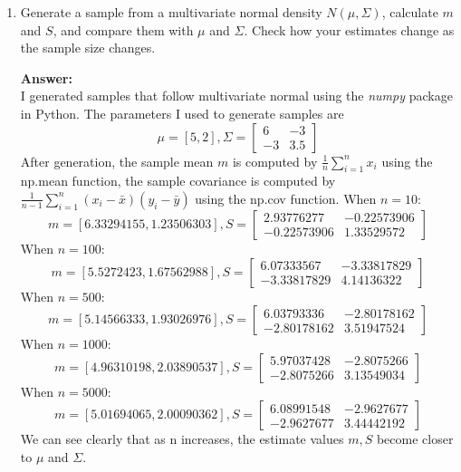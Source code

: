 \documentclass{article}
\begin{document}
\begin{enumerate}
    \item Generate a sample from a multivariate normal density $N(\mu, \Sigma)$, calculate $m$ and $S$, and compare them with $\mu$ and $\Sigma$. Check how your estimates change as the sample size changes. %
    
    \textbf{Answer:} \\
    I generated samples that follow multivariate normal using the \emph{numpy} package in Python. 
    The parameters I used to generate samples are 
    $$
    \mu=[5, 2], \Sigma=
    \left[\begin{array}{ll}
    6 & -3 \\
    -3 & 3.5
    \end{array}\right]
    $$
    After generation, the sample mean $m$ is computed by $\frac{1}{n}\sum^n_{i=1} x_i$ using the np.mean function, the sample covariance is computed by $\frac{1}{n-1}\sum_{i=1}^n (x_i-\bar x)(y_i-\bar y)$ using the np.cov function. 
    When $n=10$:\\
    $$
    m = [6.33294155, 1.23506303], S = 
    \left[\begin{array}{ll}
        2.93776277 & -0.22573906 \\
        -0.22573906 & 1.33529572
        \end{array}\right]
    $$
    When $n=100$:\\
    $$
    m = [5.5272423, 1.67562988], S = 
    \left[\begin{array}{ll}
        6.07333567 & -3.33817829 \\
        -3.33817829 & 4.14136322
        \end{array}\right]
    $$
    When $n=500$:\\
    $$
    m = [5.14566333, 1.93026976], S = 
    \left[\begin{array}{ll}
        6.03793336 & -2.80178162 \\
        -2.80178162 & 3.51947524
        \end{array}\right]
    $$
    When $n=1000$:\\
    $$
    m = [4.96310198, 2.03890537], S = 
    \left[\begin{array}{ll}
        5.97037428 & -2.8075266 \\
        -2.8075266 & 3.13549034
        \end{array}\right]
    $$
    When $n=5000$:\\
    $$
    m = [5.01694065, 2.00090362], S = 
    \left[\begin{array}{ll}
        6.08991548 & -2.9627677 \\
        -2.9627677 & 3.44442192
        \end{array}\right]
    $$
    We can see clearly that as n increases, the estimate values $m, S$ become closer to $\mu$ and $\Sigma$.


\end{enumerate}
\end{document}
